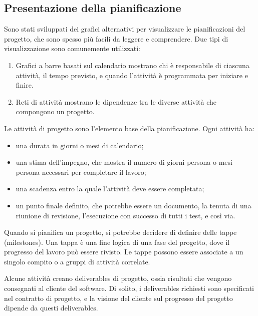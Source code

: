 \subsection{Presentazione della pianificazione}
Sono stati sviluppati dei grafici alternativi per visualizzare le pianificazioni del progetto, che sono spesso più facili da leggere e comprendere. Due tipi di visualizzazione sono comunemente utilizzati:
\begin{enumerate}
    \item Grafici a barre basati sul calendario mostrano chi è responsabile di ciascuna attività, il tempo previsto, e quando l'attività è programmata per iniziare e finire.
    \item Reti di attività mostrano le dipendenze tra le diverse attività che compongono un progetto.
\end{enumerate}
Le attività di progetto sono l'elemento base della pianificazione. Ogni attività ha:
\begin{itemize}
    \item una durata in giorni o mesi di calendario;
    \item una stima dell’impegno, che mostra il numero di giorni persona o mesi persona necessari per completare il lavoro;
    \item una scadenza entro la quale l’attività deve essere completata;
    \item un punto finale definito, che potrebbe essere un documento, la tenuta di una riunione di revisione, l’esecuzione con successo di tutti i test, e così via.
\end{itemize}

Quando si pianifica un progetto, si potrebbe decidere di definire delle tappe (milestones). Una tappa è una fine logica di una fase del progetto, dove il progresso del lavoro può essere rivisto. Le tappe possono essere associate a un singolo compito o a gruppi di attività correlate.

Alcune attività creano deliverables di progetto, ossia risultati che vengono consegnati al cliente del software. Di solito, i deliverables richiesti sono specificati nel contratto di progetto, e la visione del cliente sul progresso del progetto dipende da questi deliverables. 

